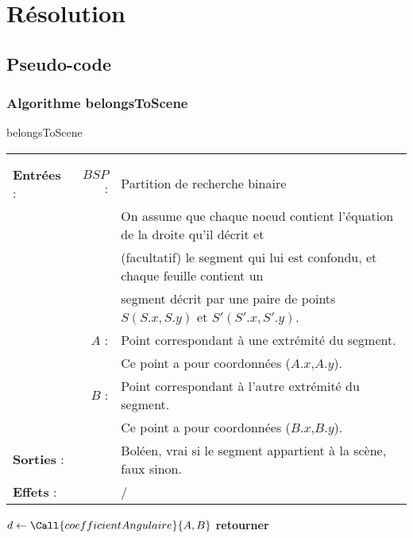 \documentclass[10pt]{article}
\begin{document}
\newpage
\section{Résolution}
\subsection{Pseudo-code}
\subsubsection{Algorithme belongsToScene}
\begin{algorithm}[H]
\caption{belongsToScene}
\begin{tabular}{lrl}
\\
&&\\
\textbf{Entrées} : &$BSP$ : &Partition de recherche binaire\\
& &On assume que chaque noeud contient l'équation de la droite qu'il décrit et\\
&&(facultatif) le segment qui lui est confondu, et chaque feuille contient un\\
&&segment décrit par une paire de points $S(S.x,S.y)$ et $S'(S'.x,S'.y)$.\\ 
&$A$ : &Point correspondant à une extrémité du segment.\\
& &Ce point a pour coordonnées ($A.x$,$A.y$).\\
&$B$ : &Point correspondant à l'autre extrémité du segment.\\
& &Ce point a pour coordonnées ($B.x$,$B.y$).\\[.25cm]
\textbf{Sorties} :& &Boléen, vrai si le segment appartient à la scène, faux sinon.\\[.25cm]
\textbf{Effets} :& &/\\[.25cm]
\end{tabular}
\begin{algorithmic}[1]
\State $d\gets\Call{coefficientAngulaire}{A,B}$
\State \textbf{retourner} 
\EndProcedure
\end{algorithmic}
\end{algorithm}
\end{document}
